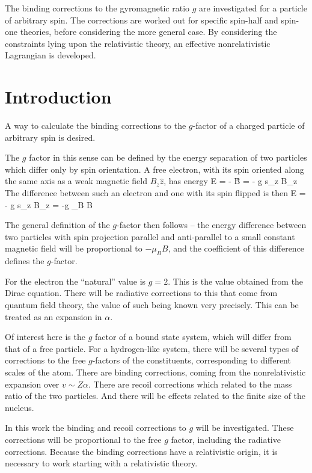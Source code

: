 The binding corrections to the gyromagnetic ratio $g$ are investigated for a particle of arbitrary spin.  The corrections are worked out for specific spin-half and spin-one theories, before considering the more general case.  By considering the constraints lying upon the relativistic theory, an effective nonrelativistic Lagrangian is developed.

\chapter{Introduction}


A way to calculate the binding corrections to the $g$-factor of a charged particle of arbitrary spin is desired.

The $g$ factor in this sense can be defined by the energy separation of two particles which differ only by spin orientation.  A free electron, with its spin oriented along the same axis as a weak magnetic field $B_z\hat{z}$, has energy
\beq
 E = - \gv{\mu} \cdot \v{B} = - g s_z B_z
\eeq
The difference between such an electron and one with its spin flipped is then
\beq
	\delta E = - g s_z B_z = -g \mu_B B
\eeq


The general definition of the $g$-factor then follows -- the energy difference between two particles with spin projection parallel and anti-parallel to a small constant magnetic field will be proportional to $ - \mu_B B$, and the coefficient of this difference defines the $g$-factor.

For the electron the ``natural'' value is $g=2$.  This is the value obtained from the Dirac equation.  There will be radiative corrections to this that come from quantum field theory, the value of such being known very precisely.  This can be treated as an expansion in $\alpha$.

Of interest here is the $g$ factor of a bound state system, which will differ from that of a free particle.  For a hydrogen-like system, there will be several types of corrections to the free $g$-factors of the constituents, corresponding to different scales of the atom.  There are binding corrections, coming from the nonrelativistic expansion over $v \sim Z\alpha$.  There are recoil corrections which related to the mass ratio of the two particles.  And there will be effects related to the finite size of the nucleus.

In this work the binding and recoil corrections to $g$ will be investigated.  These corrections will be proportional to the free $g$ factor, including the radiative corrections.  Because the binding corrections have a relativistic origin, it is necessary to work starting with a relativistic theory.

